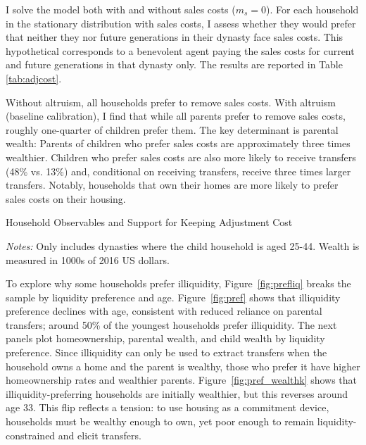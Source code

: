 \documentclass[12pt]{article}
\begin{document}
I solve the model both with and without sales costs ($m_s=0$). For each household in the stationary distribution with sales costs, I assess whether they would prefer that neither they nor future generations in their dynasty face sales costs. This hypothetical corresponds to a benevolent agent paying the sales costs for current and future generations in that dynasty only. The results are reported in Table \ref{tab:adjcost}.

Without altruism, all households prefer to remove sales costs. With altruism (baseline calibration), I find that while all parents prefer to remove sales costs, roughly one-quarter of children prefer them. The key determinant is parental wealth: Parents of children who prefer sales costs are approximately three times wealthier. Children who prefer sales costs are also more likely to receive transfers (48\% vs. 13\%) and, conditional on receiving transfers, receive three times larger transfers. Notably, households that own their homes are more likely to prefer sales costs on their housing.

\begin{table}
	\center
	\caption{Household Observables and Support for Keeping Adjustment Cost}\label{tab:adjcost}
	\begin{threeparttable}
		
		\footnotesize
		
	\end{threeparttable}
	{\begin{footnotesize}\begin{flushleft}\vspace{-0.1in}%
		\textit{Notes:} Only includes dynasties where the child household is aged 25-44. Wealth is measured in 1000s of 2016 US dollars.
	\end{flushleft}\end{footnotesize}}		
\end{table}

To explore why some households prefer illiquidity, Figure~\ref{fig:prefliq} breaks the sample by liquidity preference and age. Figure~\ref{fig:pref} shows that illiquidity preference declines with age, consistent with reduced reliance on parental transfers; around 50\% of the youngest households prefer illiquidity. The next panels plot homeownership, parental wealth, and child wealth by liquidity preference. Since illiquidity can only be used to extract transfers when the household owns a home and the parent is wealthy, those who prefer it have higher homeownership rates and wealthier parents. Figure~\ref{fig:pref_wealthk} shows that illiquidity-preferring households are initially wealthier, but this reverses around age 33. This flip reflects a tension: to use housing as a commitment device, households must be wealthy enough to own, yet poor enough to remain liquidity-constrained and elicit transfers.
\end{document}
